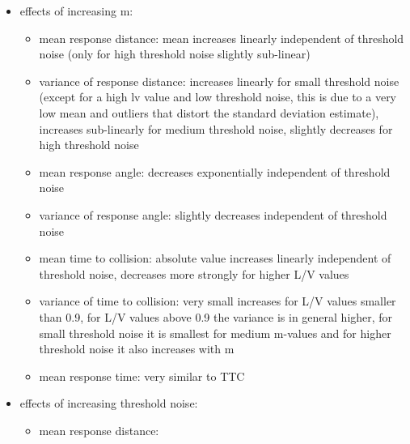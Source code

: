 \documentclass[a4paper,10pt,hidelinks]{scrartcl}
\begin{document}
	\begin{itemize}
		\item effects of increasing m:
		\begin{itemize}
			\item mean response distance: mean increases linearly independent 
			of threshold noise (only for high threshold noise slightly 
			sub-linear)
			\item variance of response distance: increases linearly for small 
			threshold noise (except for a high lv value and low threshold 
			noise, this is due to a very low mean and outliers that distort the 
			standard deviation estimate), increases sub-linearly for medium 
			threshold noise, slightly decreases for high threshold noise
			\item mean response angle: decreases exponentially  independent of 
			threshold noise
			\item variance of response angle: slightly decreases independent of 
			threshold noise
			\item mean time to collision: absolute value increases linearly 
			independent of threshold noise, decreases more strongly for higher 
			L/V values
			\item variance of time to collision: very small increases for L/V 
			values smaller than 0.9, for L/V values above 0.9 the variance is 
			in general higher, for small threshold noise it is smallest for 
			medium m-values and for higher threshold noise it also increases 
			with m
			\item mean response time: very similar to TTC
		\end{itemize}
		\item effects of increasing threshold noise:
		\begin{itemize}
			\item mean response distance: 
		\end{itemize}
	\end{itemize}
\end{document}
